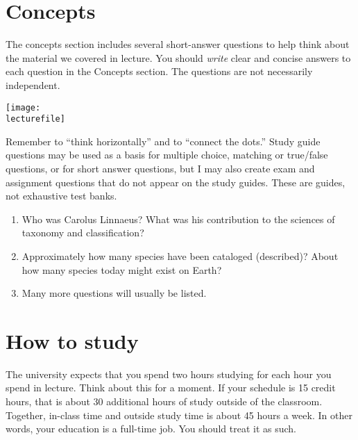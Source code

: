 \documentclass[letterpaper]{tufte-handout}
\newcommand\lecturefile{163_lecture01_fullsize}
\begin{document}
\section{Concepts}

The concepts section includes several short-answer questions to help think about the material we covered in lecture. You should \emph{write} clear and concise answers to each question in the Concepts section.  The questions are not necessarily independent.  
\begin{marginfigure}
	\texttt{[image: \\lecturefile]}
\end{marginfigure}


Remember to “think horizontally” and to “connect the dots.”  Study guide questions may be used as a basis for multiple choice, matching or true/false questions, or for short answer questions, but I may also create exam and assignment questions that do not appear on the study guides.  These are guides, not exhaustive test banks.


\begin{enumerate}
	\item Who was Carolus Linnaeus? What was his contribution to the sciences of taxonomy and classification?

	\item Approximately how many species have been cataloged (described)? About how many species today might exist on Earth?
	
	\item Many more questions will usually be listed.
	
\end{enumerate}

\section{How to study}

The university expects that you spend two hours studying for each hour you spend in lecture. Think about this for a moment. If your schedule is 15 credit hours, that is about 30 additional hours of study outside of the classroom. Together, in-class time and outside study time is about 45 hours a week. In other words, your education is a full-time job.  You should treat it as such.
\end{document}
